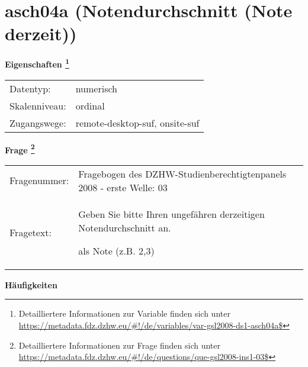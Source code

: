 
    \setcounter{footnote}{0}

    \vspace*{-1.8cm}
	\section{asch04a (Notendurchschnitt (Note derzeit))}
	\label{section:asch04a}



    \vspace*{0.5cm}
    \noindent\textbf{Eigenschaften
	\footnote{Detailliertere Informationen zur Variable finden sich unter
		\url{https://metadata.fdz.dzhw.eu/\#!/de/variables/var-gsl2008-ds1-asch04a$}}}\\
	\begin{tabularx}{\hsize}{@{}lX}
	Datentyp: & numerisch \\
	Skalenniveau: & ordinal \\
	Zugangswege: &
	  remote-desktop-suf, 
	  onsite-suf
 \\
    \end{tabularx}



				\vspace*{0.5cm}
                \noindent\textbf{Frage
	                \footnote{Detailliertere Informationen zur Frage finden sich unter
		              \url{https://metadata.fdz.dzhw.eu/\#!/de/questions/que-gsl2008-ins1-03$}}}\\
				\begin{tabularx}{\hsize}{@{}lX}
					Fragenummer: &
					  Fragebogen des DZHW-Studienberechtigtenpanels 2008 - erste Welle:
					  03
 \\
					Fragetext: & Geben Sie bitte Ihren ungefähren derzeitigen Notendurchschnitt an.\par  als Note (z.B. 2,3) \\
				\end{tabularx}





        		\vspace*{0.5cm}
                \noindent\textbf{Häufigkeiten}

